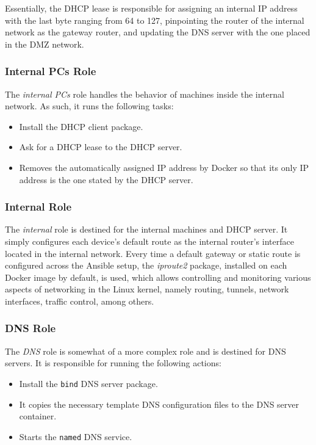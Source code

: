 Essentially, the DHCP lease is responsible for assigning an internal IP address with the last byte ranging from 64 to 127, pinpointing the router of the internal network as the gateway router, and updating the DNS server with the one placed in the DMZ network.

\subsubsection{Internal PCs Role} \label{sec:ansible_internal_pcs_role}

The \textit{internal PCs} role handles the behavior of machines inside the internal network. As such, it runs the following tasks:

\begin{itemize}
    \item Install the DHCP client package.
    \item Ask for a DHCP lease to the DHCP server.
    \item Removes the automatically assigned IP address by Docker so that its only IP address is the one stated by the DHCP server.
\end{itemize}

\subsubsection{Internal Role} \label{sec:ansible_internal_role}

The \textit{internal} role is destined for the internal machines and DHCP server. It simply configures each device's default route as the internal router's interface located in the internal network. Every time a default gateway or static route is configured across the Ansible setup, the \textit{iproute2} package, installed on each Docker image by default, is used, which allows controlling and monitoring various aspects of networking in the Linux kernel, namely routing, tunnels, network interfaces, traffic control, among others.

\subsubsection{DNS Role} \label{sec:ansible_dns_role}

The \textit{DNS} role is somewhat of a more complex role and is destined for DNS servers. It is responsible for running the following actions:

\begin{itemize}
    \item Install the \texttt{bind} DNS server package.
    \item It copies the necessary template DNS configuration files to the DNS server container.
    \item Starts the \texttt{named} DNS service.
\end{itemize}

